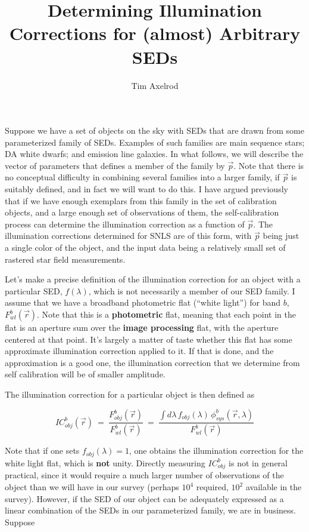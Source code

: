 \documentclass[12pt,preprint]{aastex}
\begin{document}
\title{Determining Illumination Corrections for (almost) Arbitrary SEDs}

\author{Tim Axelrod}

Suppose we have a set of objects on the sky with SEDs that are
drawn from some parameterized family of SEDs.  Examples of such families
are main sequence stars; DA white dwarfs; and emission line galaxies.
In what follows, we will describe the vector of parameters that
defines a member of the family by $\vec{p}$.  Note that there is no
conceptual difficulty in combining several families into a larger
family, if $\vec{p}$ is suitably defined, and in fact we will want to
do this.  I have argued previously that if we have enough exemplars
from this family in
the set of calibration objects, and a large enough
set of observations of them, the self-calibration process can
determine the illumination correction as a function of $\vec{p}$.  The
illumination corrections determined for SNLS are of this form, with
$\vec{p}$ being just a single color of the object, and the input data
being a relatively small set of rastered star field measurements.

Let's make a precise definition of the illumination correction for an
object with a particular SED, $f(\lambda)$, which is not necessarily a
member of our SED family.  I assume that we have a
broadband photometric flat (``white light'') for band $b$,
$F^{b}_{wl}(\vec{r})$. Note that this is a {\bf photometric} flat,
meaning that each point in the flat is an aperture sum over the {\bf
  image processing} flat, with the aperture centered at that
point. It's largely a matter of taste whether this flat has some
approximate illumination correction applied to it.  If that is done,
and the approximation is a good one, the illumination correction that
we determine from self calibration will be of smaller amplitude.

The illumination correction for a particular object is then defined as

\begin{equation}
IC^{b}_{obj}(\vec{r})~=~\frac{F^{b}_{obj}(\vec{r})}{F^{b}_{wl}(\vec{r})}~=~
\frac{\int {d\lambda \, f_{obj}(\lambda) \, \phi^{b}_{sys}(\vec{r}, \lambda)}}{F^{b}_{wl}(\vec{r})}
\end{equation}


Note that if one sets $f_{obj}(\lambda)=1$, one obtains the
illumination correction for the white light flat, which is {\bf not}
unity.  Directly measuring $IC^{b}_{obj}$ is not in general practical, since
it would require a much larger number of observations of the object
than we will have in our survey (perhaps $10^4$ required, $10^2$
available in the survey).  However, if the SED of our object can be
adequately expressed as a linear combination of the SEDs in our
parameterized family, we are in business.  Suppose
\end{document}

